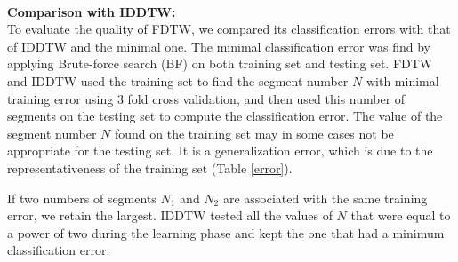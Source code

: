  

 \paragraph{}\textbf{Comparison with IDDTW:}  \\
To evaluate the quality of FDTW, we compared its classification errors with
that of IDDTW  and the minimal one. The minimal classification error was find by applying Brute-force search (BF) on both training set and testing set. FDTW and IDDTW used
the training set to find the segment number $N$ with minimal training error using 3 fold cross validation, and then used this number of segments on the testing set to compute the classification error. The value of the segment number $N$ found on the training set may in some cases not be appropriate for the testing set. It is a  generalization error, which is due to the representativeness of the training set (Table \ref{error}).  
 
If two numbers of
segments $N_1$ and $N_2$ are associated with the same training error, we retain the largest.
IDDTW tested all the values of $N$ that were equal to a power of two during the learning phase and kept the one that had  a minimum classification error.  





